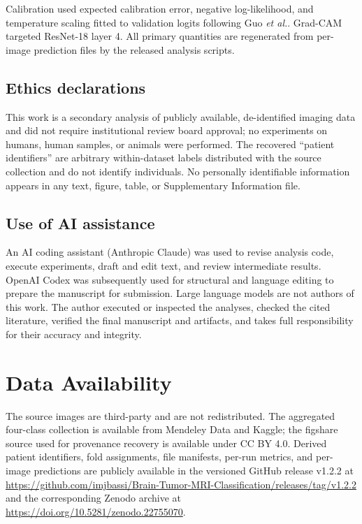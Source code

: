 ﻿\documentclass[11pt]{article}
\begin{document}
Calibration used expected calibration error, negative log-likelihood, and temperature scaling fitted to validation logits following Guo \textit{et al.}\cite{guo2017calibration}. Grad-CAM targeted ResNet-18 layer 4\cite{selvaraju2017grad}. All primary quantities are regenerated from per-image prediction files by the released analysis scripts.

\subsection{Ethics declarations}
This work is a secondary analysis of publicly available, de-identified imaging data and did not require institutional review board approval; no experiments on humans, human samples, or animals were performed. The recovered ``patient identifiers'' are arbitrary within-dataset labels distributed with the source collection and do not identify individuals. No personally identifiable information appears in any text, figure, table, or Supplementary Information file.

\subsection{Use of AI assistance}
An AI coding assistant (Anthropic Claude) was used to revise analysis code, execute experiments, draft and edit text, and review intermediate results. OpenAI Codex was subsequently used for structural and language editing to prepare the manuscript for submission. Large language models are not authors of this work. The author executed or inspected the analyses, checked the cited literature, verified the final manuscript and artifacts, and takes full responsibility for their accuracy and integrity.

\section*{Data Availability}
The source images are third-party and are not redistributed. The aggregated four-class collection is available from Mendeley Data\cite{ghaffar2024dataset} and Kaggle\cite{nickparvar2021dataset}; the figshare source used for provenance recovery is available under CC BY 4.0\cite{cheng2015enhanced}. Derived patient identifiers, fold assignments, file manifests, per-run metrics, and per-image predictions are publicly available in the versioned GitHub release v1.2.2 at \url{https://github.com/imjbassi/Brain-Tumor-MRI-Classification/releases/tag/v1.2.2} and the corresponding Zenodo archive at \url{https://doi.org/10.5281/zenodo.22755070}.
\end{document}
